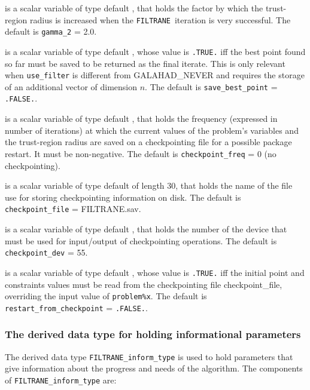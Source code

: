 \documentclass{galahad}
\newcommand{\packagename}{FILTRANE}
\newcommand{\sym}{\sf\small}
\newcommand{\filtrane}{{\tt \packagename}}
\begin{document}
\begin{description}
 is a scalar variable of type default \realdp, that holds the
factor by which the trust-region radius is increased when the \filtrane\
iteration is very successful.
The default is {\tt gamma\_2} = 2.0.

 is a scalar variable of type default \logical,
whose value is {\tt .TRUE.} iff the best point found so far must be saved to be
returned as the final iterate.  This is only relevant when
{\tt use\_filter} is different from {\sym GALAHAD\_NEVER}
and requires the storage of an additional vector of dimension $n$.
The default is {\tt save\_best\_point} = {\tt .FALSE.}.

 is a scalar variable of type default \integer, that
holds the frequency (expressed in number of iterations) at which
the current values of the problem's variables and the trust-region radius are
saved on a checkpointing file for a possible package restart. It must be
non-negative.
The default is {\tt checkpoint\_freq} = 0 (no checkpointing).

 is a scalar variable of type default \character of
length 30, that holds the name of the file use for storing checkpointing
information on disk.
The default is {\tt checkpoint\_file} = FILTRANE.sav.

 is a scalar variable of type default \integer, that
holds the number of the device that must be used for input/output of
checkpointing operations.
The default is {\tt checkpoint\_dev} = 55.

 is a scalar variable of type default \logical,
whose value is {\tt .TRUE.} iff the initial point and constraints values must
be read from the checkpointing file checkpoint\_file,
overriding the input value of {\tt problem\%x}.
The default is {\tt restart\_from\_checkpoint} = {\tt .FALSE.}.

\end{description}


\subsubsection{The derived data type for holding informational
parameters}\label{typeinform}
The derived data type
{\tt \packagename\_inform\_type}
is used to hold parameters that give information about the progress and needs
of the algorithm. The components of
{\tt \packagename\_inform\_type}
are:
\end{document}
